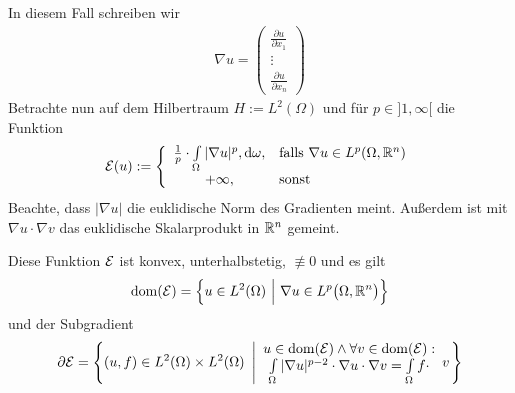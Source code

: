 \begin{beispiel}
	In diesem Fall schreiben wir
	\begin{align*}
		\nabla u=\begin{pmatrix}
			\frac{\partial u}{\partial x_1}\\
			\vdots\\
			\frac{\partial u}{\partial x_n}
		\end{pmatrix}
	\end{align*}
	Betrachte nun auf dem Hilbertraum $H:=L^2(\Omega)$ und für $p\in]1,\infty[$ die Funktion
	\begin{align*}
		\mathcal{E}(u):=\left\lbrace\begin{array}{cl}
			\frac{1}{p}\cdot\int\limits_\Omega |\nabla u|^p,\mathrm{d}\omega, &\text{falls } \nabla u\in L^p(\Omega,\mathbb{R}^n)\\
			+\infty, &\text{sonst }
		\end{array}\right.
	\end{align*}
	Beachte, dass $|\nabla u|$ die euklidische Norm des Gradienten meint. 
	Außerdem ist mit $\nabla u\cdot\nabla v$ das euklidische Skalarprodukt in $\mathbb{R}^n$ gemeint.

	\begin{lemma} %
		Diese Funktion $\mathcal{E}$ ist konvex, unterhalbstetig, $\not\equiv0$ und es gilt
		\begin{align*}
			\operatorname{dom}(\mathcal{E})=\Big\lbrace u\in L^2(\Omega)~\Big|~\nabla u\in L^p\big(\Omega,\mathbb{R}^n\big)\Big\rbrace
		\end{align*}
		und der Subgradient
		\begin{align*}
			\partial\mathcal{E}=\left\lbrace(u,f)\in L^2(\Omega)\times L^2(\Omega)~\left|
			\begin{array}{c}
				u\in\operatorname{dom}(\mathcal{E})\wedge\forall v\in\operatorname{dom}(\mathcal{E}):\\
				\int\limits_\Omega|\nabla u|^{p-2}\cdot\nabla u\cdot\nabla v=\int\limits_\Omega f\cdot 
			\end{array}
			v\right.\right\rbrace
		\end{align*}
	\end{lemma}
	

\end{beispiel}
